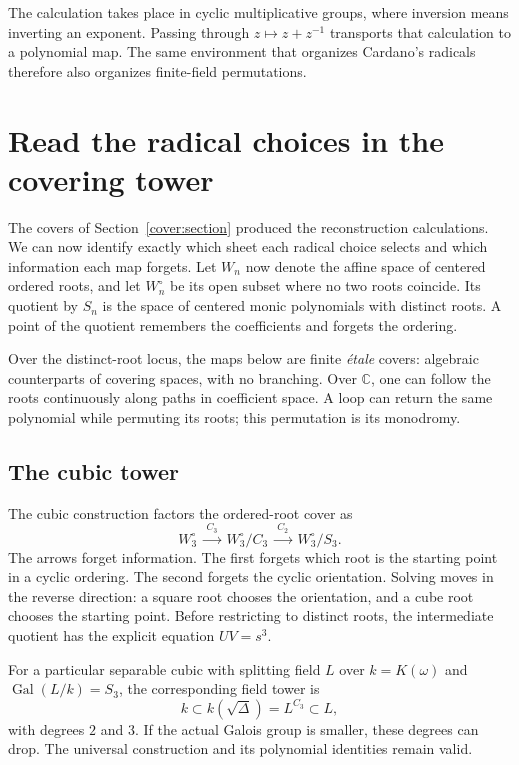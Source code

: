 \documentclass[11pt]{article}
\theoremstyle{remark}
\newcommand{\C}{\mathbb C}
\newcommand{\Gal}{\operatorname{Gal}}
\begin{document}
The calculation takes place in cyclic multiplicative groups, where inversion means inverting an exponent. Passing through \(z\mapsto z+z^{-1}\) transports that calculation to a polynomial map. The same environment that organizes Cardano's radicals therefore also organizes finite-field permutations.

\section{Read the radical choices in the covering tower}

The covers of Section~\ref{cover:section} produced the reconstruction calculations. We can now identify exactly which sheet each radical choice selects and which information each map forgets. Let \(W_n\) now denote the affine space of centered ordered roots, and let \(W_n^\circ\) be its open subset where no two roots coincide. Its quotient by \(S_n\) is the space of centered monic polynomials with distinct roots. A point of the quotient remembers the coefficients and forgets the ordering.

Over the distinct-root locus, the maps below are finite \emph{\'{e}tale} covers: algebraic counterparts of covering spaces, with no branching. Over \(\C\), one can follow the roots continuously along paths in coefficient space. A loop can return the same polynomial while permuting its roots; this permutation is its monodromy.

\subsection{The cubic tower}

The cubic construction factors the ordered-root cover as
\begin{equation}
W_3^\circ\ \xrightarrow{\ C_3\ }\ W_3^\circ/C_3
\ \xrightarrow{\ C_2\ }\ W_3^\circ/S_3.
\label{eq:cubic-cover}
\end{equation}
The arrows forget information. The first forgets which root is the starting point in a cyclic ordering. The second forgets the cyclic orientation. Solving moves in the reverse direction: a square root chooses the orientation, and a cube root chooses the starting point. Before restricting to distinct roots, the intermediate quotient has the explicit equation \(UV=s^3\).

For a particular separable cubic with splitting field \(L\) over \(k=K(\omega)\) and \(\Gal(L/k)=S_3\), the corresponding field tower is
\[
k\subset k(\sqrt\Delta)=L^{C_3}\subset L,
\]
with degrees \(2\) and \(3\). If the actual Galois group is smaller, these degrees can drop. The universal construction and its polynomial identities remain valid.
\end{document}
